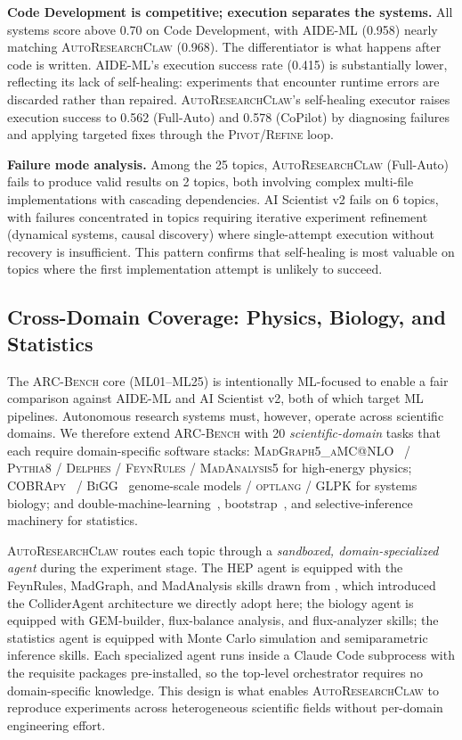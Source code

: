 \documentclass{llmxive}
\providecommand{\system}{\textsc{AutoResearchClaw}}
\providecommand{\bench}{\textsc{ARC-Bench}}
\begin{document}
\noindent \textbf{Code Development is competitive; execution separates the systems.} All systems score above 0.70 on Code Development, with AIDE-ML (0.958) nearly matching \system{} (0.968). The differentiator is what happens after code is written. AIDE-ML's execution success rate (0.415) is substantially lower, reflecting its lack of self-healing: experiments that encounter runtime errors are discarded rather than repaired. \system{}'s self-healing executor raises execution success to 0.562 (Full-Auto) and 0.578 (CoPilot) by diagnosing failures and applying targeted fixes through the \textsc{Pivot}/\textsc{Refine} loop.

\noindent \textbf{Failure mode analysis.} Among the 25 topics, \system{} (Full-Auto) fails to produce valid results on 2 topics, both involving complex multi-file implementations with cascading dependencies. AI Scientist v2 fails on 6 topics, with failures concentrated in topics requiring iterative experiment refinement (dynamical systems, causal discovery) where single-attempt execution without recovery is insufficient. This pattern confirms that self-healing is most valuable on topics where the first implementation attempt is unlikely to succeed.

\vspace{-0.3em}
\subsection{Cross-Domain Coverage: Physics, Biology, and Statistics}
\label{sec:scidomain}
\vspace{-0.3em}

The \bench{} core (\textsc{ML01}--\textsc{ML25}) is intentionally ML-focused to enable a fair comparison against AIDE-ML and AI Scientist v2, both of which target ML pipelines.
Autonomous research systems must, however, operate across scientific domains.
We therefore extend \bench{} with 20 \emph{scientific-domain} tasks that each require domain-specific software stacks: \textsc{MadGraph5\_aMC@NLO}~\citep{Alwall2014} / \textsc{Pythia8} / \textsc{Delphes} / \textsc{FeynRules} / \textsc{MadAnalysis5} for high-energy physics; \textsc{COBRApy}~\citep{Ebrahim2013} / \textsc{BiGG}~\citep{King2016} genome-scale models / \textsc{optlang} / GLPK for systems biology; and double-machine-learning~\citep{Chernozhukov2018}, bootstrap~\citep{Efron1979}, and selective-inference machinery for statistics.

\system{} routes each topic through a \emph{sandboxed, domain-specialized agent} during the experiment stage.
The HEP agent is equipped with the FeynRules, MadGraph, and MadAnalysis skills drawn from \citet{qiu2026endtoendarchitecturecolliderphysics}, which introduced the ColliderAgent architecture we directly adopt here; the biology agent is equipped with GEM-builder, flux-balance analysis, and flux-analyzer skills; the statistics agent is equipped with Monte Carlo simulation and semiparametric inference skills.
Each specialized agent runs inside a Claude Code subprocess with the requisite packages pre-installed, so the top-level orchestrator requires no domain-specific knowledge.
This design is what enables \system{} to reproduce experiments across heterogeneous scientific fields without per-domain engineering effort.
\end{document}
